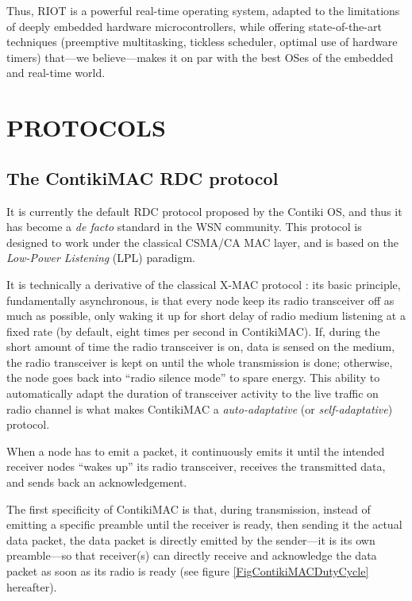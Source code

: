 \documentclass[a4paper,twoside]{article}
\begin{document}
Thus, RIOT is a powerful real-time operating system, adapted to the
limitations of deeply embedded hardware microcontrollers, while offering
state-of-the-art techniques (preemptive multitasking, tickless scheduler,
optimal use of hardware timers) that---we believe---makes it on par with
the best OSes of the embedded and real-time world.



\section{\uppercase{Protocols}}
\label{SectProtoDescription}

\subsection{The ContikiMAC RDC protocol}

It is currently the default RDC protocol proposed by the Contiki OS, and
thus it has become a \textit{de facto} standard in the WSN community.
This protocol is designed to work under the classical CSMA/CA MAC layer,
and is based on the \emph{Low-Power Listening} (LPL) paradigm.

It is technically a derivative of the classical X-MAC protocol \cite{XMAC}:
its basic principle, fundamentally asynchronous, is that every node keep
its radio transceiver off as much as possible, only waking it up for short
delay of radio medium listening at a fixed rate (by default, eight times
per second in ContikiMAC). If, during the short amount of time the radio
transceiver is on, data is sensed on the medium, the radio transceiver
is kept on until the whole transmission is done; otherwise, the node
goes back into ``radio silence mode'' to spare energy.
This ability to automatically adapt the duration of transceiver activity
to the live traffic on radio channel is what makes ContikiMAC a
\emph{auto-adaptative} (or \emph{self-adaptative}) protocol.

When a node has to emit a packet, it continuously emits it until the
intended receiver nodes ``wakes up'' its radio transceiver, receives
the transmitted data, and sends back an acknowledgement.

The first specificity of ContikiMAC is that, during transmission, instead
of emitting a specific preamble until the receiver is ready, then sending
it the actual data packet, the data packet is directly emitted by the
sender---it is its own preamble---so that receiver(s) can directly receive
and acknowledge the data packet as soon as its radio is ready (see figure
\ref{FigContikiMACDutyCycle} hereafter).
\end{document}
